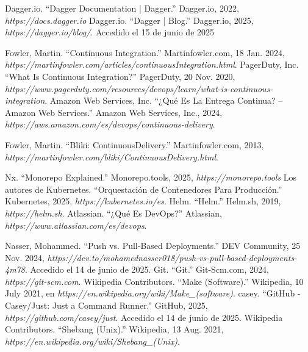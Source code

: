 
\begin{thebibliography}{99}
 Dagger.io. ``Dagger Documentation | Dagger.'' Dagger.io, 2022, {\it https://docs.dagger.io}
 Dagger.io. “Dagger | Blog.” Dagger.io, 2025, {\it https://dagger.io/blog/}. Accedido el 15 de junio de 2025

 Fowler, Martin. ``Continuous Integration.'' Martinfowler.com, 18 Jan. 2024, {\it https://martinfowler.com/articles/continuousIntegration.html}.
 PagerDuty, Inc. ``What Is Continuous Integration?'' PagerDuty, 20 Nov. 2020, {\it https://www.pagerduty.com/resources/devops/learn/what-is-continuous-integration}.
 Amazon Web Services, Inc. ``¿Qué Es La Entrega Continua? – Amazon Web Services.'' Amazon Web Services, Inc., 2024, {\it https://aws.amazon.com/es/devops/continuous-delivery}.

 Fowler, Martin. ``Bliki: ContinuousDelivery.'' Martinfowler.com, 2013, {\it https://martinfowler.com/bliki/ContinuousDelivery.html}.

 Nx. ``Monorepo Explained.'' Monorepo.tools, 2025, {\it https://monorepo.tools}
 Los autores de Kubernetes. ``Orquestación de Contenedores Para Producción.'' Kubernetes, 2025, {\it https://kubernetes.io/es}.
 Helm. ``Helm.'' Helm.sh, 2019, {\it https://helm.sh}.
 Atlassian. ``¿Qué Es DevOps?'' Atlassian, {\it https://www.atlassian.com/es/devops}.

 Nasser, Mohammed. ``Push vs. Pull-Based Deployments.'' DEV Community, 25 Nov. 2024, {\it https://dev.to/mohamednasser018/push-vs-pull-based-deployments-4m78}. Accedido el 14 de junio de 2025.
 Git. ``Git.'' Git-Scm.com, 2024, {\it https://git-scm.com}.
 Wikipedia Contributors. ``Make (Software).'' Wikipedia, 10 July 2021, en {\it https://en.wikipedia.org/wiki/Make\_(software)}.
 casey. ``GitHub - Casey/Just: Just a Command Runner.'' GitHub, 2025, {\it https://github.com/casey/just}. Accedido el 14 de junio de 2025.
 Wikipedia Contributors. ``Shebang (Unix).'' Wikipedia, 13 Aug. 2021, {\it https://en.wikipedia.org/wiki/Shebang\_(Unix)}.


\end{thebibliography}
